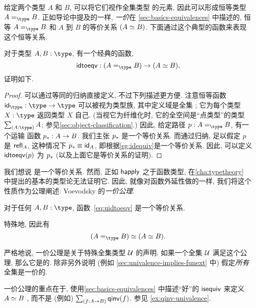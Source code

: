 %
%
给定两个类型 $A$ 和 $B$, 可以将它们视作全集类型 \type 的元素, 因此可以形成恒等类型 $\id[\type]AB$.
正如导论中提及的一样, \emph{一价}在 \cref{sec:basics-equivalences} 中描述的, 恒等 $\id[\type]AB$ 和 $A$ 到 $B$ 的等价关系 $(\eqv AB)$.
下面通过这个典型的函数来表现这个恒等关系.

\begin{lem}
    \label{thm:idtoeqv}
    对于类型 $A,B:\type$, 有一个经典的函数,
    \begin{equation}
        \label{eq:uidtoeqv}
        \idtoeqv : (\id[\type]AB) \to (\eqv A B),
    \end{equation}
    证明如下.
\end{lem}
\begin{proof}
    可以通过等同的归纳直接定义, 不过下列描述更方便.
    注意恒等函数 $\idfunc[\type]:\type\to\type$ 可以被视为类型族, 其中定义域是全集 \type;
    它为每个类型 $X:\type$ 返回类型 $X$ 自己.
    (当视它为纤维化时, 它的全空间是``点类型''的类型 $\sm{A:\type}A$; 参见\cref{sec:object-classification}.)
    因此, 给定路径 $p:A =_\type B$, 有一个运输 函数 $\transf{p}:A \to B$.
    我们主张 $\transf{p}$ 是一个等价关系.
    而通过归纳, 足以假定 $p$ 是 $\refl A$, 这种情况下 $\transf{p} \jdeq \idfunc[A]$, 即根据\cref{eg:idequiv}是一个等价关系.
    因此, 可以定义 $\idtoeqv(p)$ 为 $\transf{p}$ (以及上面它是等价关系的证明).
\end{proof}

我们想说 \idtoeqv 是一个等价关系.
然而, 正如 $\happly$ 之于函数类型, 在\cref{cha:typetheory} 中提出的基本的类型论无法证明它.
因此, 就像对函数外延性做的一样, 我们将这个性质作为公理阐述: Voevodsky 的\emph{一价公理}.

\begin{axiom}[Univalence]
    \label{axiom:univalence}
    对于任何 $A,B:\type$, 函数~\eqref{eq:uidtoeqv} 是一个等价关系.
\end{axiom}

特殊地, 因此有
\[
    \eqv{(\id[\type]{A}{B})}{(\eqv A B)}.
\]

严格地说, 一价公理是关于特殊全集类型 $\UU$ 的声明.
如果一个全集 $\UU$ 满足这个公理, 那么它是的.
%
%
除非另外说明 (例如 \cref{sec:univalence-implies-funext} 中) 假定\emph{所有}全集是一价的.

\begin{rmk}
    一价公理的重点在于, 使用\cref{sec:basics-equivalences} 中描述``好''的 $\isequiv$ 来定义 $\eqv AB$ , 而不是 (例如) $\sm{f:A\to B} \qinv(f)$.
    参见 \cref{ex:qinv-univalence}.
\end{rmk}

